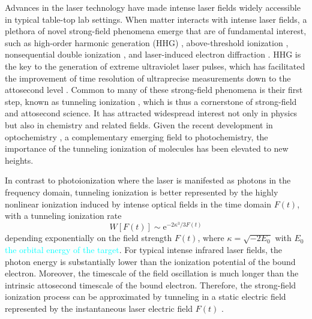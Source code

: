 \documentclass[preprint,12pt]{elsarticle} %
\newcommand{\ee}{\mathrm{e}}    %
\newcommand{\cyan}[1]{\textcolor{cyan}{#1}}     %
\begin{document}
Advances in the laser technology have made intense laser fields widely accessible in typical table-top lab settings. When matter interacts with intense laser fields, a plethora of novel strong-field phenomena emerge that are of fundamental interest, such as high-order harmonic generation (HHG) \cite{krause_high_1992,corkum_plasma_1993,popmintchev_the_2010}, above-threshold ionization \cite{agostini_free_1979,becker_above_2002,milosevic_above_2006}, nonsequential double ionization \cite{walker_precision_1994}, and laser-induced electron diffraction \cite{blaga_imaging_2012,wolter_ultrafast_2016}. HHG is the key to the generation of extreme ultraviolet laser pulses, which has facilitated the improvement of time resolution of ultraprecise measurements down to the attosecond level \cite{krausz_attosecond_2009,dahlstroem_introduction_2012,pazourek_attosecond_2015,kheifets_wigner_2023}. Common to many of these strong-field phenomena is their first step, known as tunneling ionization \cite{keldysh_ionization_1965,chin_from_2004}, which is thus a cornerstone of strong-field and attosecond science. It has attracted widespread interest not only in physics but also in chemistry and related fields. Given the recent development in optochemistry \cite{li_light_2022,ma_transient_2021}, a complementary emerging field to photochemistry, the importance of the tunneling ionization of molecules has been elevated to new heights.

In contrast to photoionization where the laser is manifested as photons in the frequency domain, tunneling ionization is better represented by the highly nonlinear ionization induced by intense optical fields in the time domain $F(t)$, with a tunneling ionization rate \cite{ammosov_tunnel_1986,delone_tunneling_1998}
\begin{equation}
    W[F(t)] \sim \ee^{-2\kappa^3/3F(t)}
    \label{eq:FieldFactor}
\end{equation}
depending exponentially on the field strength $F(t)$, where $\kappa=\sqrt{-2E_0}$ with $E_0$ \cyan{the orbital energy of the target}. For typical intense infrared laser fields, the photon energy is substantially lower than the ionization potential of the bound electron. Moreover, the timescale of the field oscillation is much longer than the intrinsic attosecond timescale of the bound electron. Therefore, the strong-field ionization process can be approximated by tunneling in a static electric field represented by the instantaneous laser electric field $F(t)$ \cite{tolstikhin_adiabatic_2010, tolstikhin_adiabatic_2012}.
\end{document}
